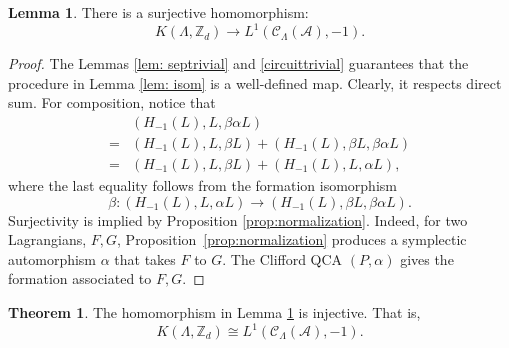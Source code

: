 \documentclass{article}
\theoremstyle{definition}
\newtheorem{lem}[theorem]{Lemma}
\newcommand{\CA}{{ \mathcal A}}
\newcommand{\ZZ}{{\mathbb Z}}
\newtheorem{thm}{Theorem}
\begin{document}
\begin{lem} \label{lem: surjectivity}
    There is a surjective homomorphism:
    $$K(\Lambda, \ZZ_d)\rightarrow L^1(\mathcal{C}_{\Lambda}(\CA), -1).$$
\end{lem}
\begin{proof}   
    The Lemmas \ref{lem: septrivial} and \ref{circuittrivial} guarantees that the procedure in Lemma \ref{lem: isom} is a well-defined map. Clearly, it respects direct sum. For composition, notice that 
    \begin{align*}
        &(H_{-1}(L), L, \beta \alpha L)\\
        =&(H_{-1}(L), L,  \beta L)+(H_{-1}(L), \beta L, \beta\alpha L)\\
        =&(H_{-1}(L), L,  \beta L)+(H_{-1}(L), L, \alpha L),
    \end{align*}
    where the last equality follows from the formation isomorphism $$\beta: (H_{-1}(L), L, \alpha L)\rightarrow (H_{-1}(L), \beta L, \beta\alpha L).$$
    Surjectivity is implied by Proposition \ref{prop:normalization}. Indeed, for two Lagrangians, $F, G$, Proposition~\ref{prop:normalization} produces a symplectic automorphism $\alpha$ that takes $F$ to $G$. The Clifford QCA $(P, \alpha)$ gives the formation associated to $F, G$. 
\end{proof}
\begin{thm} \label{thm: injectivity}
    The homomorphism in Lemma \ref{lem: surjectivity} is injective. That is, 
    $$K(\Lambda, \ZZ_d)\cong L^1(\mathcal{C}_{\Lambda}(\CA), -1).$$
\end{thm}
\end{document}
